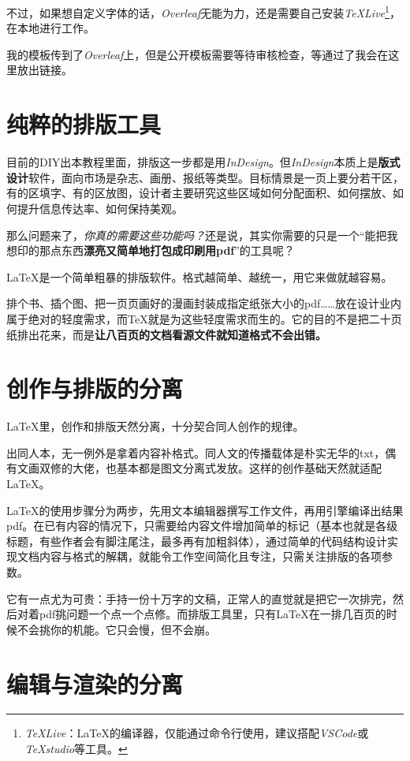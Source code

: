 \documentclass[10pt,openany]{book}
\begin{document}
不过，如果想自定义字体的话，\textit{Overleaf}无能为力，还是需要自己安装\textit{TeXLive}\footnote{\textit{TeXLive}：\LaTeX 的编译器，仅能通过命令行使用，建议搭配\textit{VSCode}或\textit{TeXstudio}等工具。}，在本地进行工作。

我的模板传到了\textit{Overleaf}上，但是公开模板需要等待审核检查，等通过了我会在这里放出链接。

\section{纯粹的排版工具}

目前的DIY出本教程里面，排版这一步都是用\textit{InDesign}。但\textit{InDesign}本质上是\textbf{版式设计}软件，面向市场是杂志、画册、报纸等类型。目标情景是一页上要分若干区，有的区填字、有的区放图，设计者主要研究这些区域如何分配面积、如何摆放、如何提升信息传达率、如何保持美观。

那么问题来了，\emph{你真的需要这些功能吗？}还是说，其实你需要的只是一个“能把我想印的那点东西\textbf{漂亮又简单地打包成印刷用pdf}”的工具呢？

\LaTeX 是一个简单粗暴的排版软件。格式越简单、越统一，用它来做就越容易。

排个书、插个图、把一页页画好的漫画封装成指定纸张大小的pdf……放在设计业内属于绝对的轻度需求，而\TeX 就是为这些轻度需求而生的。它的目的不是把二十页纸排出花来，而是\textbf{让八百页的文档看源文件就知道格式不会出错。}

\section{创作与排版的分离}

\LaTeX 里，创作和排版天然分离，十分契合同人创作的规律。

出同人本，无一例外是拿着内容补格式。同人文的传播载体是朴实无华的txt，偶有文画双修的大佬，也基本都是图文分离式发放。这样的创作基础天然就适配\LaTeX 。

\LaTeX 的使用步骤分为两步，先用文本编辑器撰写工作文件，再用引擎编译出结果pdf。在已有内容的情况下，只需要给内容文件增加简单的标记（基本也就是各级标题，有些作者会有脚注尾注，最多再有加粗斜体），通过简单的代码结构设计实现文档内容与格式的解耦，就能令工作空间简化且专注，只需关注排版的各项参数。

它有一点尤为可贵：手持一份十万字的文稿，正常人的直觉就是把它一次排完，然后对着pdf挑问题一个点一个点修。而排版工具里，只有\LaTeX 在一排几百页的时候不会挑你的机能。它只会慢，但不会崩。

\section{编辑与渲染的分离}
\end{document}
